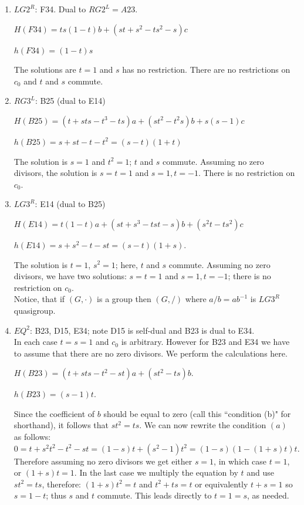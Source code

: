 \documentclass[11pt]{amsart}
\theoremstyle{definition}
\begin{document}
\begin{enumerate}
\item[(5)] $LG2^R$: F34.  Dual to $RG2^L=A23$.

    

    $H(F34) = ts(1-t)b +(st+s^2-ts^2-s)c $

    $h(F34) = (1-t)s$

     The solutions are $t=1$ and $s$ has no restriction. There are no restrictions on $c_0$ and $t$ and $s$ commute.

\item[(6)] $RG3^L$: B25 (dual to E14)

$H(B25) =(t+sts-t^3-ts)a+(st^2-t^2s)b+s(s-1)c $

$h(B25) = s+st-t-t^2 = (s-t)(1+t)$

 The solution is $s=1$ and $t^2=1$; $t$ and $s$ commute.  Assuming no zero divisors, the solution is $s=t=1$ and $s=1,t=-1$. There is no restriction on $c_0$. 
    
\item[(7)] $LG3^R$: E14 (dual to B25)

    

    $H(E14) = t(1-t)a+(st+s^3-tst-s)b+(s^2t-ts^2)c$

$h(E14) = s+s^2-t-st= (s-t)(1+s).$ 

     The solution is $t=1$, $s^2=1$; here, $t$ and $s$ commute.  Assuming no zero divisors, we have two solutions: $s=t=1$ and $s=1,t=-1$; there is no restriction on $c_0$. \\
    Notice, that if $(G,\cdot)$ is a group then $(G,/ )$ where $a/b=ab^{-1}$ is $LG3^R$ quasigroup.

    
\item[(8)] $EQ^2$: B23, D15, E34; note D15 is self-dual and B23 is dual to E34.\\  
In each case $t=s=1$ and $c_0$ is arbitrary. However for B23 and E34 we have to assume that there are no zero divisors. We perform the calculations here.

$H(B23) = (t+sts-t^2-st)a+(st^2-ts)b$. 

$h(B23) = (s-1)t.$

Since the coefficient of $b$ should be equal to zero (call this ``condition (b)" for shorthand), it follows that $st^2 =ts$. 
 We can now rewrite the condition  $(a)$ as follows: 
$0=t+s^2t^2-t^2-st = (1-s)t+(s^2-1)t^2= (1-s)(1-(1+s)t)t.$
Therefore assuming no zero divisors  we get either $s=1$, in which case $t=1$, or $(1+s)t=1$. In the last case we multiply the equation  by $t$
and use $st^2=ts$, therefore:
$(1+s)t^2=t$ and $t^2+ts=t$ or equivalently $t+s=1$ so $s=1-t$; thus $s$ and $t$ commute. This leads directly to $t=1=s$, as needed.


\end{enumerate}
\end{document}
